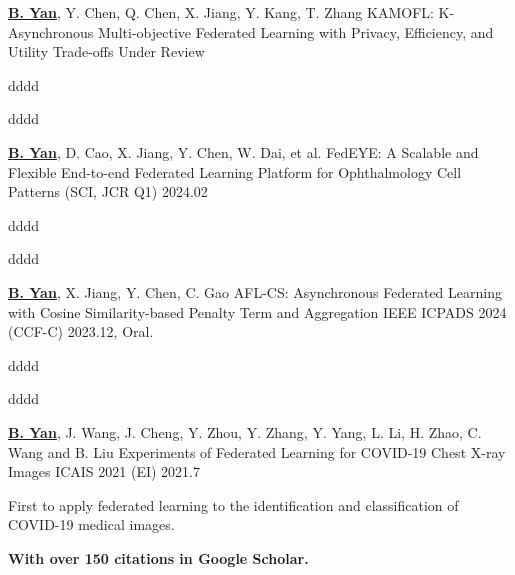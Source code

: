 

\begin{cventries}
\cventry
{\underline{\textbf{B. Yan}}, Y. Chen, Q. Chen, X. Jiang, Y. Kang, T. Zhang} %
{KAMOFL: K-Asynchronous Multi-objective Federated Learning with Privacy, Efficiency, and Utility Trade-offs} %
{Under Review} %
{} %
{
	\begin{cvitems} %
		\item {dddd}
		\item {dddd}
	\end{cvitems}
}

\cventry
{\underline{\textbf{B. Yan}}, D. Cao, X. Jiang, Y. Chen, W. Dai, et al.} %
{FedEYE: A Scalable and Flexible End-to-end Federated Learning Platform for Ophthalmology} %
{Cell Patterns (SCI, JCR Q1)} %
{2024.02} %
{
	\begin{cvitems} %
		\item {dddd}
		\item {dddd}
	\end{cvitems}
}

\cventry
{\underline{\textbf{B. Yan}}, X. Jiang, Y. Chen, C. Gao} %
{AFL-CS: Asynchronous Federated Learning with Cosine Similarity-based Penalty Term and Aggregation} %
{IEEE ICPADS 2024 (CCF-C)} %
{2023.12, Oral.} %
{
	\begin{cvitems} %
		\item {dddd}
		\item {dddd}
	\end{cvitems}
}

\cventry
{\underline{\textbf{B. Yan}}, J. Wang, J. Cheng, Y. Zhou, Y. Zhang, Y. Yang, L. Li, H. Zhao, C. Wang and B. Liu} %
{Experiments of Federated Learning for COVID-19 Chest X-ray Images} %
{ICAIS 2021 (EI)} %
{2021.7} %
{
	\begin{cvitems} %
		\item {First to apply federated learning to the identification and classification of COVID-19 medical images.}
		\item {\textcolor{awesome-red}{\textbf{With over 150 citations in Google Scholar.}}}
	\end{cvitems}
}


\end{cventries}
